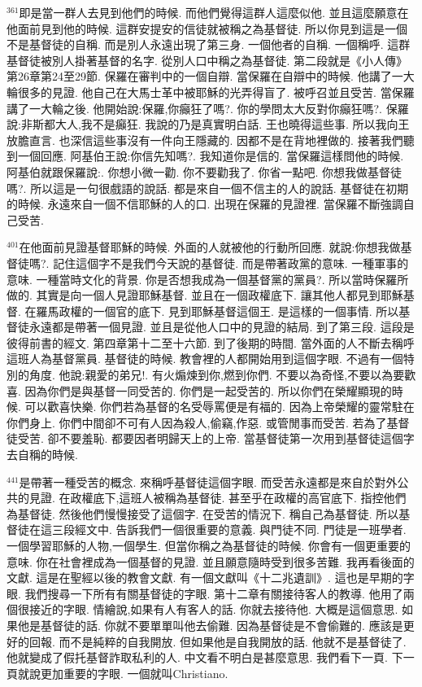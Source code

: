 \documentclass{book}
\begin{document}
$^{361}$即是當一群人去見到他們的時候.
而他們覺得這群人這麼似他.
並且這麼願意在他面前見到他的時候.
這群安提安的信徒就被稱之為基督徒.
所以你見到這是一個不是基督徒的自稱.
而是別人永遠出現了第三身.
一個他者的自稱.
一個稱呼.
這群基督徒被別人掛著基督的名字.
從別人口中稱之為基督徒.
第二段就是《小人傳》第26章第24至29節.
保羅在審判中的一個自辯.
當保羅在自辯中的時候.
他講了一大輪很多的見證.
他自己在大馬士革中被耶穌的光弄得盲了.
被呼召並且受苦.
當保羅講了一大輪之後.
他開始說:保羅,你癲狂了嗎?.
你的學問太大反對你癲狂嗎?.
保羅說:非斯都大人,我不是癲狂.
我說的乃是真實明白話.
王也曉得這些事.
所以我向王放膽直言.
也深信這些事沒有一件向王隱藏的.
因都不是在背地裡做的.
接著我們聽到一個回應.
阿基伯王說:你信先知嗎?.
我知道你是信的.
當保羅這樣問他的時候.
阿基伯就跟保羅說:.
你想小微一勸.
你不要勸我了.
你省一點吧.
你想我做基督徒嗎?.
所以這是一句很戲語的說話.
都是來自一個不信主的人的說話.
基督徒在初期的時候.
永遠來自一個不信耶穌的人的口.
出現在保羅的見證裡.
當保羅不斷強調自己受苦.

$^{401}$在他面前見證基督耶穌的時候.
外面的人就被他的行動所回應.
就說:你想我做基督徒嗎?.
記住這個字不是我們今天說的基督徒.
而是帶著政黨的意味.
一種軍事的意味.
一種當時文化的背景.
你是否想我成為一個基督黨的黨員?.
所以當時保羅所做的.
其實是向一個人見證耶穌基督.
並且在一個政權底下.
讓其他人都見到耶穌基督.
在羅馬政權的一個官的底下.
見到耶穌基督這個王.
是這樣的一個事情.
所以基督徒永遠都是帶著一個見證.
並且是從他人口中的見證的結局.
到了第三段.
這段是彼得前書的經文.
第四章第十二至十六節.
到了後期的時間.
當外面的人不斷去稱呼這班人為基督黨員.
基督徒的時候.
教會裡的人都開始用到這個字眼.
不過有一個特別的角度.
他說:親愛的弟兄!.
有火煽煉到你,燃到你們.
不要以為奇怪,不要以為要歡喜.
因為你們是與基督一同受苦的.
你們是一起受苦的.
所以你們在榮耀顯現的時候.
可以歡喜快樂.
你們若為基督的名受辱罵便是有福的.
因為上帝榮耀的靈常駐在你們身上.
你們中間卻不可有人因為殺人,偷竊,作惡.
或管閒事而受苦.
若為了基督徒受苦.
卻不要羞恥.
都要因者明歸天上的上帝.
當基督徒第一次用到基督徒這個字去自稱的時候.

$^{441}$是帶著一種受苦的概念.
來稱呼基督徒這個字眼.
而受苦永遠都是來自於對外公共的見證.
在政權底下,這班人被稱為基督徒.
甚至乎在政權的高官底下.
指控他們為基督徒.
然後他們慢慢接受了這個字.
在受苦的情況下.
稱自己為基督徒.
所以基督徒在這三段經文中.
告訴我們一個很重要的意義.
與門徒不同.
門徒是一班學者.
一個學習耶穌的人物,一個學生.
但當你稱之為基督徒的時候.
你會有一個更重要的意味.
你在社會裡成為一個基督的見證.
並且願意隨時受到很多苦難.
我再看後面的文獻.
這是在聖經以後的教會文獻.
有一個文獻叫《十二兆遺訓》.
這也是早期的字眼.
我們搜尋一下所有有關基督徒的字眼.
第十二章有關接待客人的教導.
他用了兩個很接近的字眼.
情繪說,如果有人有客人的話.
你就去接待他.
大概是這個意思.
如果他是基督徒的話.
你就不要單單叫他去偷難.
因為基督徒是不會偷難的.
應該是更好的回報.
而不是純粹的自我開放.
但如果他是自我開放的話.
他就不是基督徒了.
他就變成了假托基督詐取私利的人.
中文看不明白是甚麼意思.
我們看下一頁.
下一頁就說更加重要的字眼.
一個就叫Christiano.
\end{document}
